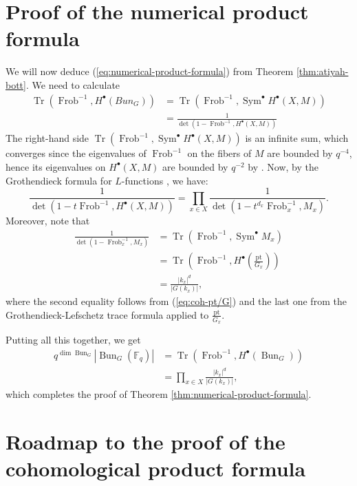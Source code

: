 \documentclass[oneside]{amsart}
\newcommand{\F}{\mathbb{F}}
\DeclareMathOperator{\Bun}{Bun}
\DeclareMathOperator{\Tr}{Tr}
\DeclareMathOperator{\Frob}{Frob}
\DeclareMathOperator{\Sym}{Sym}
\begin{document}
\section{Proof of the numerical product formula}
We will now deduce (\ref{eq:numerical-product-formula}) from Theorem \ref{thm:atiyah-bott}. We need to calculate
\begin{align*}
	\Tr(\Frob^{-1}, H^{\bullet}(Bun_G)) &= \Tr\left( \Frob^{-1}, \Sym^{\bullet}H^{\bullet}(X,M) \right)  \\
	&= \frac{1}{\det(1-\Frob^{-1},H^{\bullet}(X,M))}
\end{align*}
The right-hand side $\Tr\left( \Frob^{-1}, \Sym^{\bullet}H^{\bullet}(X,M) \right)$ is an infinite sum, which converges since the eigenvalues of $\Frob^{-1} $ on the fibers of $M$ are bounded by $q^{-4}$, hence its eigenvalues on $H^{\bullet}(X,M)$ are bounded by $q^{-2}$ by \cite{weilII}. Now, by the Grothendieck formula for $L$-functions \cite[Theorem 4.4]{freitag-kiehl}, we have:
\[
\frac{1}{\det\left( 1-t\Frob^{-1},H^{\bullet}(X,M) \right) } = \prod_{x\in X}\frac{1}{\det\left( 1-t^{d_x}\Frob_x^{-1}, M_x \right) }.
\] 
Moreover, note that
\begin{align*}
	\frac{1}{\det\left( 1-\Frob_x^{-1},M_x \right) } &= \Tr\left( \Frob^{-1}, \Sym^{\bullet}M_x \right)  \\
	&= \Tr\left( \Frob^{-1}, H^{\bullet}\left( \frac{\text{pt}}{G_x} \right)  \right)  \\
	&= \frac{|k_x|^{d}}{|G(k_x)|},
\end{align*}
where the second equality follows from (\ref{eq:coh-pt/G}) and the last one from the Grothendieck-Lefschetz trace formula applied to $\frac{\text{pt}}{G_x}$.

Putting all this together, we get
\begin{align*}
	q^{\dim\Bun_G}\left| \Bun_G(\F_q) \right| &= \Tr(\Frob^{-1}, H^{\bullet}(\Bun_G)) \\
						  &= \prod_{x\in X} \frac{|k_x|^{d}}{|G(k_x)|},
\end{align*}
which completes the proof of Theorem \ref{thm:numerical-product-formula}.

\section{Roadmap to the proof of the cohomological product formula}
\end{document}
